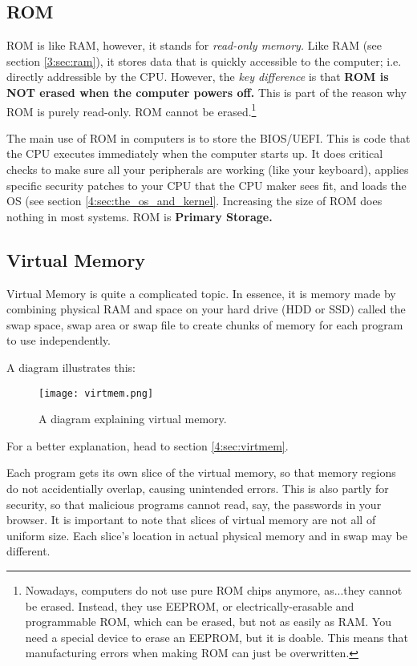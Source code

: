 \documentclass[../main.tex]{subfiles}
\begin{document}
\subsection{ROM}

ROM is like RAM, however, it stands for \emph{read-only memory.} Like RAM (see section \ref{3:sec:ram}), it stores data that is quickly accessible to the computer; i.e. directly addressible by the CPU. However, the \emph{key difference} is that \textbf{ROM is NOT erased when the computer powers off.} This is part of the reason why ROM is purely read-only. ROM cannot be erased.\footnote{Nowadays, computers do not use pure ROM chips anymore, as...they cannot be erased. Instead, they use EEPROM, or electrically-erasable and programmable ROM, which can be erased, but not as easily as RAM. You need a special device to erase an EEPROM, but it is doable. This means that manufacturing errors when making ROM can just be overwritten.}

The main use of ROM in computers is to store the BIOS/UEFI. This is code that the CPU executes immediately when the computer starts up. It does critical checks to make sure all your peripherals are working (like your keyboard), applies specific security patches to your CPU that the CPU maker sees fit, and loads the OS (see section \ref{4:sec:the_os_and_kernel}. Increasing the size of ROM does nothing in most systems. ROM is \textbf{Primary Storage.}

\subsection{Virtual Memory}
\label{3:sec:virtmem}

Virtual Memory is quite a complicated topic. In essence, it is memory made by combining physical RAM and space on your hard drive (HDD or SSD) called the swap space, swap area or swap file to create chunks of memory for each program to use independently.

A diagram illustrates this:

\begin{figure}[H]
    \centering
    \texttt{[image: virtmem.png]}
    \caption{A diagram explaining virtual memory.}
    \label{fig:virtmem}
\end{figure}

For a better explanation, head to section \ref{4:sec:virtmem}.

Each program gets its own slice of the virtual memory, so that memory regions do not accidentially overlap, causing unintended errors. This is also partly for security, so that malicious programs cannot read, say, the passwords in your browser. It is important to note that slices of virtual memory are not all of uniform size. Each slice's location in actual physical memory and in swap may be different.
\end{document}
